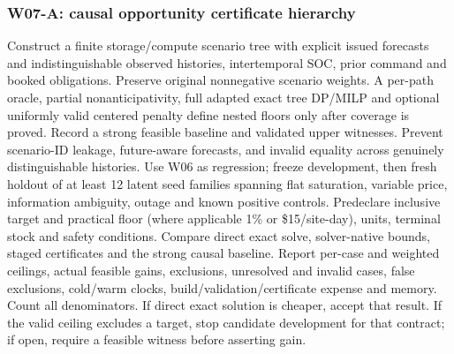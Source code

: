 \documentclass[11pt,letterpaper]{article}
\begin{document}
\subsubsection{W07-A: causal opportunity certificate hierarchy}
Construct a finite storage/compute scenario tree with explicit issued forecasts and indistinguishable observed histories, intertemporal SOC, prior command and booked obligations. Preserve original nonnegative scenario weights. A per-path oracle, partial nonanticipativity, full adapted exact tree DP/MILP and optional uniformly valid centered penalty define nested floors only after coverage is proved. Record a strong feasible baseline and validated upper witnesses. Prevent scenario-ID leakage, future-aware forecasts, and invalid equality across genuinely distinguishable histories. Use W06 as regression; freeze development, then fresh holdout of at least 12 latent seed families spanning flat saturation, variable price, information ambiguity, outage and known positive controls. Predeclare inclusive target and practical floor (where applicable 1\% or \$15/site-day), units, terminal stock and safety conditions. Compare direct exact solve, solver-native bounds, staged certificates and the strong causal baseline. Report per-case and weighted ceilings, actual feasible gains, exclusions, unresolved and invalid cases, false exclusions, cold/warm clocks, build/validation/certificate expense and memory. Count all denominators. If direct exact solution is cheaper, accept that result. If the valid ceiling excludes a target, stop candidate development for that contract; if open, require a feasible witness before asserting gain.
\end{document}
